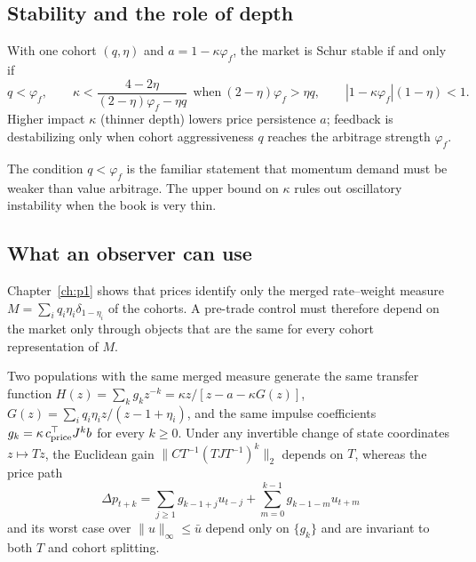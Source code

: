 \subsection{Stability and the role of depth}

\begin{proposition}\label{p2:prop:jury}
With one cohort $(q,\eta)$ and $a=1-\kappa\varphi_f$, the market is Schur stable if and only if
\begin{equation}\label{p2:eq:jury}
q<\varphi_f,\qquad \kappa<\frac{4-2\eta}{(2-\eta)\varphi_f-\eta q}\ \ \text{when}\ (2-\eta)\varphi_f>\eta q,\qquad |1-\kappa\varphi_f|(1-\eta)<1 .
\end{equation}
Higher impact $\kappa$ (thinner depth) lowers price persistence $a$; feedback is destabilizing only when cohort aggressiveness $q$ reaches the arbitrage strength $\varphi_f$.
\end{proposition}

The condition $q<\varphi_f$ is the familiar statement that momentum demand must be weaker than value arbitrage. The upper bound on $\kappa$ rules out oscillatory instability when the book is very thin.

\subsection{What an observer can use}

Chapter~\ref{ch:p1} shows that prices identify only the merged rate--weight measure $M=\sum_iq_i\eta_i\delta_{1-\eta_i}$ of the cohorts. A pre-trade control must therefore depend on the market only through objects that are the same for every cohort representation of $M$.

\begin{proposition}\label{p2:prop:invariance}
Two populations with the same merged measure generate the same transfer function $H(z)=\sum_kg_kz^{-k}=\kappa z/[z-a-\kappa G(z)]$, $G(z)=\sum_iq_i\eta_iz/(z-1+\eta_i)$, and the same impulse coefficients $g_k=\kappa\,c_{\rm price}^\top J^kb$ for every $k\ge0$. Under any invertible change of state coordinates $z\mapsto Tz$, the Euclidean gain $\|CT^{-1}(TJT^{-1})^k\|_2$ depends on $T$, whereas the price path
\[
\Delta p_{t+k}=\sum_{j\ge1}g_{k-1+j}u_{t-j}+\sum_{m=0}^{k-1}g_{k-1-m}u_{t+m}
\]
and its worst case over $\|u\|_\infty\le\bar u$ depend only on $\{g_k\}$ and are invariant to both $T$ and cohort splitting.
\end{proposition}

